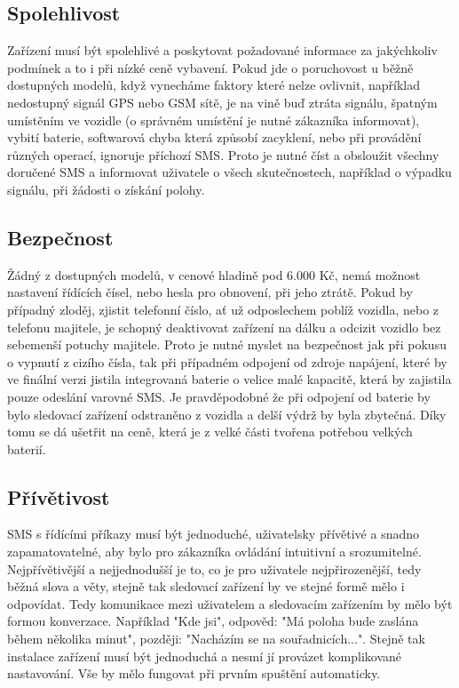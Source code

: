 \documentclass[FM,BP]{tulthesis}
\begin{document}
\subsection{Spolehlivost}
Zařízení musí být spolehlivé a poskytovat požadované informace za jakýchkoliv podmínek a to i při nízké ceně vybavení. Pokud jde o poruchovost u běžně dostupných modelů, když vynecháme faktory které nelze ovlivnit, například nedostupný signál GPS nebo GSM sítě, je na vině buď ztráta signálu, špatným umístěním ve vozidle (o správném umístění je nutné zákazníka informovat), vybití baterie, softwarová chyba která způsobí zacyklení, nebo při provádění různých operací, ignoruje příchozí SMS. Proto je nutné číst a obsloužit všechny doručené SMS a informovat uživatele o všech skutečnostech, například o výpadku signálu, při žádosti o získání polohy.

\subsection{Bezpečnost}
Žádný z dostupných modelů, v cenové hladině pod 6.000 Kč, nemá možnost nastavení řídících čísel, nebo hesla pro obnovení, při jeho ztrátě. Pokud by případný zloděj, zjistit telefonní číslo, ať už odposlechem poblíž vozidla, nebo z telefonu majitele, je schopný deaktivovat zařízení na dálku a odcizit vozidlo bez sebemenší potuchy majitele. Proto je nutné myslet na bezpečnost jak při pokusu o vypnutí z cizího čísla, tak při případném odpojení od zdroje napájení, které by ve finální verzi jistila integrovaná baterie o velice malé kapacitě, která by zajistila pouze odeslání varovné SMS. Je pravděpodobné že při odpojení od baterie by bylo sledovací zařízení odstraněno z vozidla a delší výdrž by byla zbytečná. Díky tomu se dá ušetřit na ceně, která je z velké části tvořena potřebou velkých baterií.

\subsection{Přívětivost}
SMS s řídícími příkazy musí být jednoduché, uživatelsky přívětivé a snadno zapamatovatelné, aby bylo pro zákazníka ovládání intuitivní a srozumitelné. Nejpřívětivější a nejjednodušší je to, co je pro uživatele nejpřirozenější, tedy běžná slova a věty, stejně tak sledovací zařízení by ve stejné formě mělo i odpovídat. Tedy komunikace mezi uživatelem a sledovacím zařízením by mělo být formou konverzace. Například "Kde jsi", odpověd: "Má poloha bude zaslána během několika minut", později: "Nacházím se na souřadnicích...". Stejně tak instalace zařízení musí být jednoduchá a nesmí jí provázet komplikované nastavování. Vše by mělo fungovat při prvním spuštění automaticky.
\end{document}
